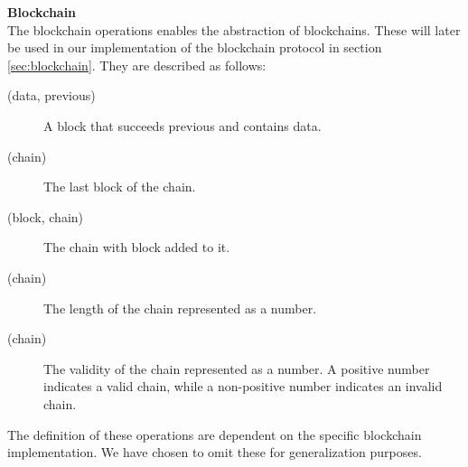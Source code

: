 \FloatBarrier

\textbf{Blockchain}\\
The blockchain operations enables the abstraction of blockchains. These will later be used in our implementation of the blockchain protocol in section \ref{sec:blockchain}.
They are described as follows:

\begin{description}
    \item[(data, previous)]
        A block that succeeds previous and contains data.
    \item[(chain)]
        The last block of the chain.
    \item[(block, chain)]
        The chain with block added to it.
    \item[(chain)]
        The length of the chain represented as a number.
    \item[(chain)]
        The validity of the chain represented as a number. A positive number indicates a valid chain, while a non-positive number indicates an invalid chain.
\end{description}

The definition of these operations are dependent on the specific blockchain implementation. We have chosen to omit these for generalization purposes.
